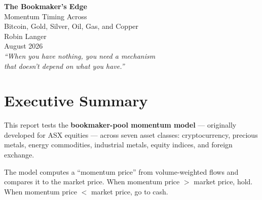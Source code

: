 \documentclass[11pt,a4paper]{article}
\begin{document}

\begin{center}
\vspace*{3cm}
{\Huge\bfseries\color{accent} The Bookmaker's Edge}\\[1em]
{\LARGE Momentum Timing Across\\[0.3em]
Bitcoin, Gold, Silver, Oil, Gas, and Copper}\\[2em]
{\large Robin Langer}\\[0.5em]
{\small August 2026}\\[3em]
\textit{``When you have nothing, you need a mechanism\\
that doesn't depend on what you have.''}
\vspace*{2cm}
\end{center}

\thispagestyle{empty}
\newpage


\section*{Executive Summary}

This report tests the \textbf{bookmaker-pool momentum model} ---
originally developed for ASX equities --- across seven asset classes:
cryptocurrency, precious metals, energy commodities, industrial
metals, equity indices, and foreign exchange.

The model computes a ``momentum price'' from volume-weighted flows
and compares it to the market price. When momentum price $>$ market
price, hold. When momentum price $<$ market price, go to cash.
\end{document}
